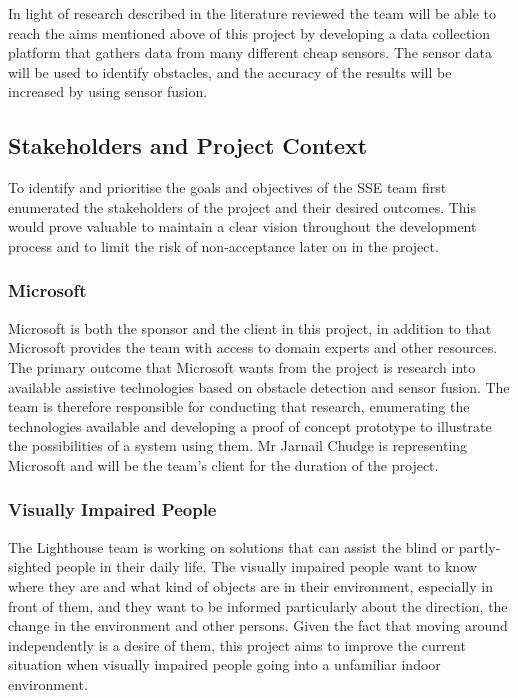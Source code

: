 \documentclass[prodmode,acmtosem]{acmsmall} %
\begin{document}
In light of research described in the literature reviewed the team will be able to reach the aims mentioned above of this project by developing a data collection platform that gathers data from many different cheap sensors. The sensor data will be used to identify obstacles, and the accuracy of the results will be increased by using sensor fusion.





\subsection{Stakeholders and Project Context}
To identify and prioritise the goals and objectives of the SSE team first enumerated the stakeholders of the project and their desired outcomes. This would prove valuable to maintain a clear vision throughout the development process and to limit the risk of non-acceptance later on in the project.

\subsubsection{Microsoft}
Microsoft is both the sponsor and the client in this project, in addition to that Microsoft provides the team with access to domain experts and other resources. The primary outcome that Microsoft wants from the project is research into available assistive technologies based on obstacle detection and sensor fusion. The team is therefore responsible for conducting that research, enumerating the technologies available and developing a proof of concept prototype to illustrate the possibilities of a system using them.
Mr Jarnail Chudge is representing Microsoft and will be the team's client for the duration of the project.

\subsubsection{Visually Impaired People}
The Lighthouse team is working on solutions that can assist the blind or partly-sighted people in their daily life. The visually impaired people want to know where they are and what kind of objects are in their environment, especially in front of them, and they want to be informed particularly about the direction, the change in the environment and other persons. Given the fact that moving around independently is a desire of them, this project aims to improve the current situation when visually impaired people going into a unfamiliar indoor environment.
\end{document}
